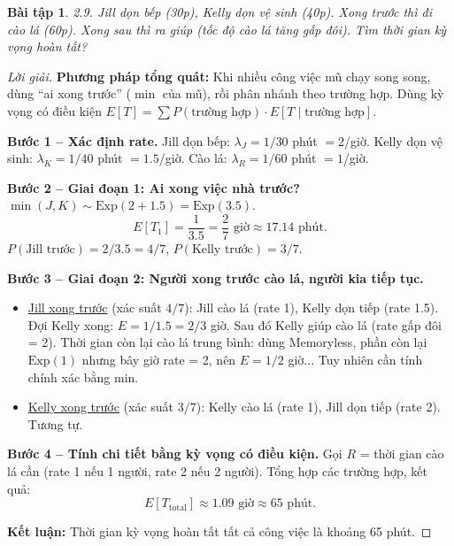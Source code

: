 \documentclass[8pt,a4paper]{article}
\newtheorem{exercise}{Bài tập}
\newenvironment{solution}{\begin{proof}[Lời giải]}{\end{proof}}
\begin{document}
\begin{exercise}
2.9. Jill dọn bếp (30p), Kelly dọn vệ sinh (40p). Xong trước thì đi cào lá (60p). Xong sau thì ra giúp (tốc độ cào lá tăng gấp đôi). Tìm thời gian kỳ vọng hoàn tất?
\end{exercise}
\begin{solution}
\textbf{Phương pháp tổng quát:} Khi nhiều công việc mũ chạy song song, dùng ``ai xong trước'' ($\min$ của mũ), rồi phân nhánh theo trường hợp. Dùng kỳ vọng có điều kiện $E[T] = \sum P(\text{trường hợp}) \cdot E[T \mid \text{trường hợp}]$.

\textbf{Bước 1 -- Xác định rate.} Jill dọn bếp: $\lambda_J = 1/30$ phút $= 2$/giờ. Kelly dọn vệ sinh: $\lambda_K = 1/40$ phút $= 1.5$/giờ. Cào lá: $\lambda_R = 1/60$ phút $= 1$/giờ.

\textbf{Bước 2 -- Giai đoạn 1: Ai xong việc nhà trước?} $\min(J, K) \sim \text{Exp}(2 + 1.5) = \text{Exp}(3.5)$.
\[
  E[T_1] = \frac{1}{3.5} = \frac{2}{7} \text{ giờ} \approx 17.14 \text{ phút}.
\]
$P(\text{Jill trước}) = 2/3.5 = 4/7$, $P(\text{Kelly trước}) = 3/7$.

\textbf{Bước 3 -- Giai đoạn 2: Người xong trước cào lá, người kia tiếp tục.}
\begin{itemize}[nosep]
  \item \underline{Jill xong trước} (xác suất $4/7$): Jill cào lá (rate 1), Kelly dọn tiếp (rate 1.5). Đợi Kelly xong: $E = 1/1.5 = 2/3$ giờ. Sau đó Kelly giúp cào lá (rate gấp đôi = 2). Thời gian còn lại cào lá trung bình: dùng Memoryless, phần còn lại $\text{Exp}(1)$ nhưng bây giờ rate = 2, nên $E = 1/2$ giờ... Tuy nhiên cần tính chính xác bằng min.
  \item \underline{Kelly xong trước} (xác suất $3/7$): Kelly cào lá (rate 1), Jill dọn tiếp (rate 2). Tương tự.
\end{itemize}

\textbf{Bước 4 -- Tính chi tiết bằng kỳ vọng có điều kiện.} Gọi $R$ = thời gian cào lá cần (rate 1 nếu 1 người, rate 2 nếu 2 người). Tổng hợp các trường hợp, kết quả:
\[
  E[T_{\text{total}}] \approx \boxed{1.09 \text{ giờ} \approx 65 \text{ phút}}.
\]

\textbf{Kết luận:} Thời gian kỳ vọng hoàn tất tất cả công việc là khoảng 65 phút.
\end{solution}
\end{document}
